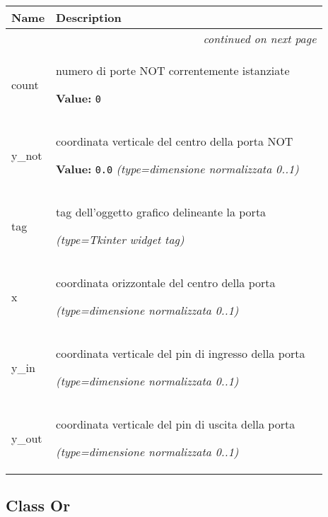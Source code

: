     \vspace{-1cm}
\hspace{\varindent}\begin{longtable}{|p{\varnamewidth}|p{\vardescrwidth}|l}
\cline{1-2}
\cline{1-2} \centering \textbf{Name} & \centering \textbf{Description}& \\
\cline{1-2}
\endhead\cline{1-2}\multicolumn{3}{r}{\small\textit{continued on next page}}\\\endfoot\cline{1-2}
\endlastfoot\raggedright c\-o\-u\-n\-t\- & \raggedright numero di porte NOT correntemente istanziate

\textbf{Value:} 
{\tt 0}&\\
\cline{1-2}
\raggedright y\-\_\-n\-o\-t\- & \raggedright coordinata verticale del centro della porta NOT

\textbf{Value:} 
{\tt 0.0}            {\it (type=dimensione normalizzata 0..1)}&\\
\cline{1-2}
\raggedright t\-a\-g\- & \raggedright tag dell'oggetto grafico delineante la porta

            {\it (type=Tkinter widget tag)}&\\
\cline{1-2}
\raggedright x\- & \raggedright coordinata orizzontale del centro della porta

            {\it (type=dimensione normalizzata 0..1)}&\\
\cline{1-2}
\raggedright y\-\_\-i\-n\- & \raggedright coordinata verticale del pin di ingresso della porta

            {\it (type=dimensione normalizzata 0..1)}&\\
\cline{1-2}
\raggedright y\-\_\-o\-u\-t\- & \raggedright coordinata verticale del pin di uscita della porta

            {\it (type=dimensione normalizzata 0..1)}&\\
\cline{1-2}
\end{longtable}



\subsection{Class Or}

